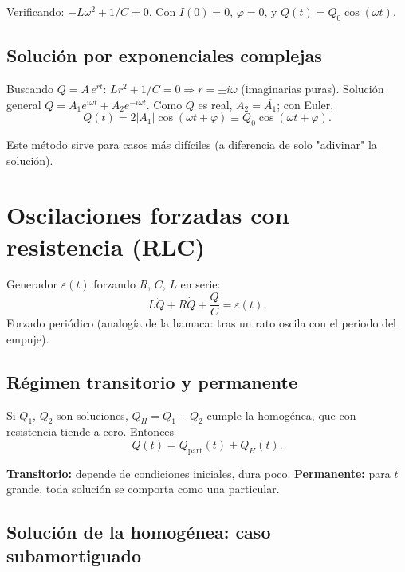 \documentclass[12pt,a4paper]{article}
\begin{document}
Verificando: $-L\omega^2 + 1/C = 0$. Con $I(0)=0$, $\varphi = 0$, y
$Q(t) = Q_0\cos(\omega t)$.

\subsection{Solución por exponenciales complejas}

Buscando $Q = A\,e^{rt}$: $L r^2 + 1/C = 0 \Rightarrow r = \pm i\omega$
(imaginarias puras). Solución general $Q = A_1 e^{i\omega t} + A_2 e^{-i\omega
t}$. Como $Q$ es real, $A_2 = \overline{A_1}$; con Euler,
\[
Q(t) = 2|A_1|\cos(\omega t + \varphi) \equiv Q_0\cos(\omega t + \varphi).
\]

\begin{notebox}[Utilidad]
  Este método sirve para casos más difíciles (a diferencia de solo
  "adivinar" la solución).
\end{notebox}



\section{Oscilaciones forzadas con resistencia (RLC)}

Generador $\varepsilon(t)$ forzando $R$, $C$, $L$ en serie:
\[
L\ddot Q + R\dot Q + \frac{Q}{C} = \varepsilon(t).
\]
Forzado periódico (analogía de la hamaca: tras un rato oscila con el periodo
del empuje).

\subsection{Régimen transitorio y permanente}

Si $Q_1$, $Q_2$ son soluciones, $Q_H = Q_1 - Q_2$ cumple la homogénea, que con
resistencia tiende a cero. Entonces
\[
Q(t) = Q_{\text{part}}(t) + Q_H(t).
\]

\begin{keybox}
  \textbf{Transitorio:} depende de condiciones iniciales, dura poco.
  \textbf{Permanente:} para $t$ grande, toda solución se comporta como una
  particular.
\end{keybox}



\subsection{Solución de la homogénea: caso subamortiguado}
\end{document}
